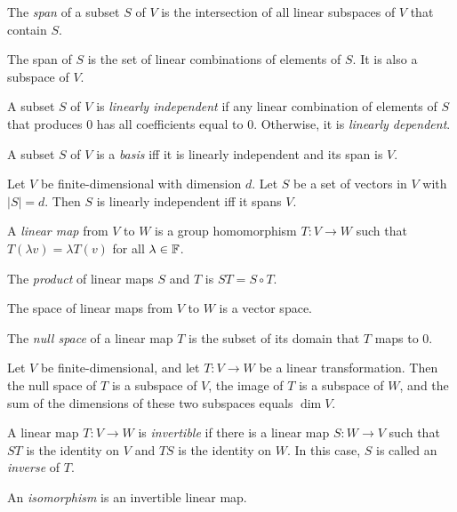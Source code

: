 \begin{defn}
  The \emph{span} of a subset $S$ of $V$ is the intersection of all linear
  subspaces of $V$ that contain $S$.  
\end{defn}
\begin{prop}
  The span of $S$ is the set of linear combinations of elements of $S$. It is
  also a subspace of $V$.
\end{prop}
\begin{defn}
  A subset $S$ of $V$ is \emph{linearly independent} if any linear combination
  of elements of $S$ that produces $ 0$ has all coefficients equal to $0$.
  Otherwise, it is \emph{linearly dependent}.
\end{defn}
\begin{prop}
  A subset $S$ of $V$ is a \emph{basis} iff it is linearly independent and its
  span is $V$.
\end{prop}
\begin{prop}
  Let $V$ be finite-dimensional with dimension $d$.
  Let $S$ be a set of vectors in $V$ with $|S|=d$. Then $S$ is linearly
  independent iff it spans $V$.
\end{prop}
\begin{defn}
  A \emph{linear map} from $V$ to $W$ is a group homomorphism
  $T:V\to W$ such that $T(\lambda v)=\lambda T(v)$ for all $\lambda\in\mathbb{F}$.

  The \emph{product} of linear maps $S$ and $T$ is $ST=S\circ T$.
\end{defn}
\begin{prop}
  The space of linear maps from $V$ to $W$ is a vector space.
\end{prop}
\begin{defn}
  The \emph{null space} of a linear map $T$ is the subset of its domain that $T$
  maps to 0.
\end{defn}
\begin{prop}
  Let $V$ be finite-dimensional, and
  let $T:V\to W$ be a linear transformation. Then the null space of $T$ is a
  subspace of $V$, the image of $T$ is a subspace of $W$, and the sum of the
  dimensions of these two subspaces equals $\dim V$.
\end{prop}
\begin{defn}
  A linear map $T:V\to W$ is \emph{invertible} if there is a linear map $S:W\to
  V$ such that $ST$ is the identity on $V$ and $TS$ is the identity on $W$. In
  this case, $S$ is called an \emph{inverse} of $T$.
\end{defn}
\begin{defn}
  An \emph{isomorphism} is an invertible linear map.
\end{defn}
